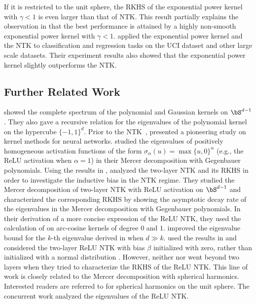 \documentclass[11pt]{article}
\begin{document}
If it is restricted to the unit sphere, the RKHS of the exponential power kernel with $\gamma<1$ is even larger than that of NTK.
This result partially explains the observation in \citep{hui2019kernel} that the best performance is attained by a highly non-smooth exponential power kernel with $\gamma < 1$. \citet{geifman2020similarity} applied the exponential power kernel and the NTK to classification and regression tasks on the UCI dataset and other large scale datasets.  Their experiment results also showed that the exponential power kernel slightly outperforms the NTK. 


\subsection{Further Related Work}

\citet{minh2006mercer} showed the complete spectrum of the polynomial and Gaussian kernels on $\bS^{d-1}$. They also gave a recursive relation for the eigenvalues of the polynomial kernel on the hypercube $\{-1,1\}^d$. 
Prior to the NTK~\citep{jacot2018neural}, \citet{cho2009kernel} presented a pioneering study on kernel methods for neural networks.
\citet{bach2017breaking} studied the eigenvalues of positively homogeneous activation functions of the form $\sigma_{\alpha}(u) = \max\{u,0\}^\alpha$ (e.g., the ReLU activation when $\alpha=1$) in their Mercer decomposition with Gegenbauer polynomials. Using the results in \citep{bach2017breaking},
\citet{bietti2019inductive} analyzed the two-layer NTK and its RKHS in order to  investigate the inductive bias in the NTK regime.  They studied the Mercer decomposition of two-layer NTK with ReLU activation on $\bS^{d-1}$ and characterized the corresponding RKHS by showing the asymptotic decay rate of the eigenvalues in the Mercer decomposition with Gegenbauer polynomials. 
In their derivation of a more concise expression of the ReLU NTK, they used the calculation of \citep{cho2009kernel} on arc-cosine kernels of degree $0$ and $1$. 
\citet{cao2019towards} improved the eigenvalue bound for the $k$-th eigenvalue derived in \citep{bietti2019inductive} when $d\gg k$. 
\citet{geifman2020similarity} used the results in \citep{bietti2019inductive} and considered the two-layer ReLU NTK with bias $\beta$ initialized with zero, rather than initialized with a normal distribution \citep{jacot2018neural}. However, neither \citep{bietti2019inductive} nor \citep{geifman2020similarity} went beyond two layers when they tried to characterize the RKHS of the ReLU NTK. This line of work \citep{bach2017breaking,bietti2019inductive,geifman2020similarity} is closely related to the Mercer decomposition with spherical harmonics. Interested readers are referred to \citep{atkinson2012spherical} for spherical harmonics on the unit sphere. The concurrent work \citep{bietti2020deep} analyzed the eigenvalues of the ReLU NTK. 
\end{document}

